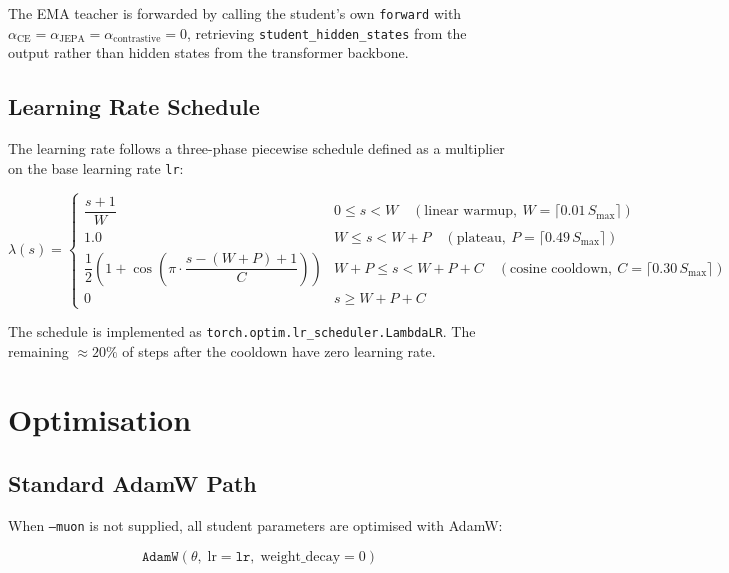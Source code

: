 \documentclass[11pt,a4paper]{article}
\begin{document}
The EMA teacher is forwarded by calling the student's own \texttt{forward} with
$\alpha_{\mathrm{CE}} = \alpha_{\mathrm{JEPA}} = \alpha_{\mathrm{contrastive}} = 0$, retrieving
\texttt{student\_hidden\_states} from the output rather than hidden states from the transformer backbone.

\subsection{Learning Rate Schedule}

The learning rate follows a three-phase piecewise schedule defined as a multiplier on the base
learning rate \texttt{lr}:

\begin{equation}
  \lambda(s) =
  \begin{cases}
    \dfrac{s+1}{W}
      & 0 \le s < W \quad (\text{linear warmup},\ W = \lceil 0.01\,S_{\max} \rceil) \\[8pt]
    1.0
      & W \le s < W + P \quad (\text{plateau},\ P = \lceil 0.49\,S_{\max} \rceil) \\[8pt]
    \dfrac{1}{2}\!\left(1 + \cos\!\left(\pi \cdot \dfrac{s - (W+P) + 1}{C}\right)\right)
      & W+P \le s < W+P+C \quad (\text{cosine cooldown},\ C = \lceil 0.30\,S_{\max} \rceil) \\[8pt]
    0
      & s \ge W + P + C
  \end{cases}
\end{equation}

The schedule is implemented as \texttt{torch.optim.lr\_scheduler.LambdaLR}.  The remaining $\approx
20\%$ of steps after the cooldown have zero learning rate.

\section{Optimisation}

\subsection{Standard AdamW Path}

When \texttt{--muon} is not supplied, all student parameters are optimised with AdamW:

\begin{equation}
  \texttt{AdamW}(\theta,\; \text{lr}=\texttt{lr},\; \text{weight\_decay}=0)
\end{equation}
\end{document}
